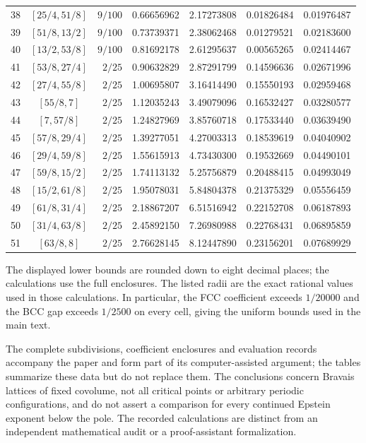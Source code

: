 \documentclass[reqno,english]{amsart}
\theoremstyle{definition}
\newtheorem{open problem}[theorem]{Open Problem}
\theoremstyle{remark}
\theoremstyle{plain}
\numberwithin{equation}{section}
\begin{document}
\begin{longtable}{@{}rcrrrrr@{}}
38 & $[25/4,51/8]$ & $9/100$ & 0.66656962 & 2.17273808 & 0.01826484 & 0.01976487 \\
39 & $[51/8,13/2]$ & $9/100$ & 0.73739371 & 2.38062468 & 0.01279521 & 0.02183600 \\
40 & $[13/2,53/8]$ & $9/100$ & 0.81692178 & 2.61295637 & 0.00565265 & 0.02414467 \\
41 & $[53/8,27/4]$ & $2/25$ & 0.90632829 & 2.87291799 & 0.14596636 & 0.02671996 \\
42 & $[27/4,55/8]$ & $2/25$ & 1.00695807 & 3.16414490 & 0.15550193 & 0.02959468 \\
43 & $[55/8,7]$ & $2/25$ & 1.12035243 & 3.49079096 & 0.16532427 & 0.03280577 \\
44 & $[7,57/8]$ & $2/25$ & 1.24827969 & 3.85760718 & 0.17533440 & 0.03639490 \\
45 & $[57/8,29/4]$ & $2/25$ & 1.39277051 & 4.27003313 & 0.18539619 & 0.04040902 \\
46 & $[29/4,59/8]$ & $2/25$ & 1.55615913 & 4.73430300 & 0.19532669 & 0.04490101 \\
47 & $[59/8,15/2]$ & $2/25$ & 1.74113132 & 5.25756879 & 0.20488415 & 0.04993049 \\
48 & $[15/2,61/8]$ & $2/25$ & 1.95078031 & 5.84804378 & 0.21375329 & 0.05556459 \\
49 & $[61/8,31/4]$ & $2/25$ & 2.18867207 & 6.51516942 & 0.22152708 & 0.06187893 \\
50 & $[31/4,63/8]$ & $2/25$ & 2.45892150 & 7.26980988 & 0.22768431 & 0.06895859 \\
51 & $[63/8,8]$ & $2/25$ & 2.76628145 & 8.12447890 & 0.23156201 & 0.07689929 \\
\end{longtable}
\endgroup
The displayed lower bounds are rounded down to eight decimal places;
the calculations use the full enclosures. The listed radii are the
exact rational values used in those calculations. In particular, the
FCC coefficient exceeds $1/20000$ and the BCC gap exceeds $1/2500$
on every cell, giving the uniform bounds used in the main text.

The complete subdivisions, coefficient enclosures and evaluation
records accompany the paper and form part of its computer-assisted
argument; the tables summarize these data but do not replace them.
The conclusions concern Bravais lattices of fixed covolume, not all
critical points or arbitrary periodic configurations, and do not
assert a comparison for every continued Epstein exponent below the
pole. The recorded calculations are distinct from an independent
mathematical audit or a proof-assistant formalization.
\end{document}
